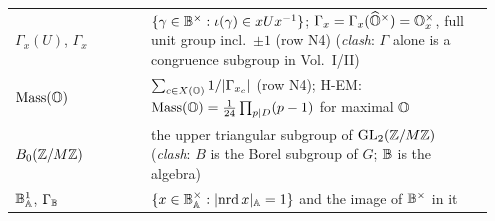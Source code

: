 \begin{longtable}{@{}p{0.27\linewidth}p{0.68\linewidth}@{}}
$\Gamma_x(U)$, $\Gamma_x$ & $\{\gamma\in\mathbb{B}^\times:\iota(\gamma)\in xUx^{-1}\}$; $\Gamma_x=\Gamma_x(\widehat{\mathbb{O}}^\times)=\mathbb{O}_x^\times$, full unit group incl.\ $\pm1$ (row N4)
  (\emph{clash}: $\Gamma$ alone is a congruence subgroup in Vol.~I/II) \\
$\operatorname{Mass}(\mathbb{O})$ & $\sum_{c\in X(\mathbb{O})}1/\lvert\Gamma_{x_c}\rvert$ (row N4); H-EM: $\operatorname{Mass}(\mathbb{O})=\frac1{24}\prod_{p\mid D}(p-1)$ for maximal $\mathbb{O}$ \\
$B_0(\mathbb{Z}/M\mathbb{Z})$ & the upper triangular subgroup of $\mathrm{GL}_2(\mathbb{Z}/M\mathbb{Z})$ (\emph{clash}: $B$ is the Borel subgroup of $G$; $\mathbb{B}$ is the algebra) \\
$\mathbb{B}_{\mathbb{A}}^1$, $\Gamma_{\mathbb{B}}$ & $\{x\in\mathbb{B}_{\mathbb{A}}^\times:\lvert\operatorname{nrd} x\rvert_{\mathbb{A}}=1\}$ and the image of $\mathbb{B}^\times$ in it \\
\bottomrule
\end{longtable}
